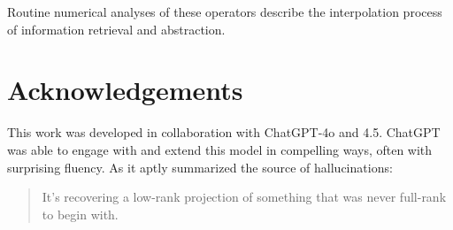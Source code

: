 \documentclass[12pt]{article}
\theoremstyle{plain}
\begin{document}
Routine numerical analyses of these operators describe the interpolation process of 
information retrieval and abstraction.

\section{Acknowledgements}

This work was developed in collaboration with ChatGPT-4o and 4.5. ChatGPT was 
able to engage with and extend this model in compelling ways, often with surprising 
fluency. As it aptly summarized the source of hallucinations:

\begin{quote}
It’s recovering a low-rank projection of something that was never full-rank to begin with.
\end{quote}
\end{document}
